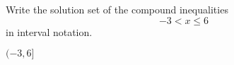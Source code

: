 

Write the solution set of the compound inequalities
\[-3<x \leq 6 \]
in interval notation.

\begin{solution}
$(-3, 6]$
\end{solution}